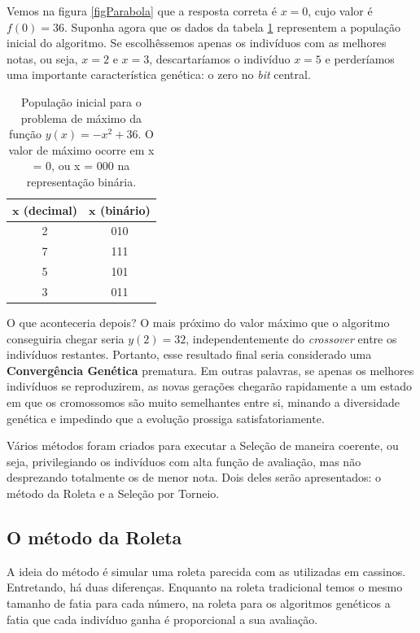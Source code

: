 	 Vemos na figura \ref{figParabola} que a resposta correta é $x = 0$, cujo valor é $f(0) = 36$. Suponha agora que os dados da tabela \ref{tabFuncMax} representem a população inicial do algoritmo. Se escolhêssemos apenas os indivíduos com as melhores notas, ou seja, $x = 2$ e $x = 3$, descartaríamos o indivíduo $x = 5$ e perderíamos uma importante característica genética: o zero no \textit{bit} central.
	 
\begin{table}[htp]
		\caption{\label{tabFuncMax}População inicial para o problema de máximo da função $y(x) = -x^2 + 36$. O valor de máximo ocorre em x = 0, ou x = 000 na representação binária.}
		\begin{center}
			\begin{tabular}{cc}
				\hline
				$\textbf{x}$ (decimal)		& $\textbf{x}$ (binário) \\
				\hline
				2							& 010 \\
				7							& 111 \\
				5							& 101 \\	
				3							& 011 \\
				\hline
			\end{tabular}
		\end{center}
	\end{table}
		
		O que aconteceria depois? O mais próximo do valor máximo que o algoritmo conseguiria chegar seria $y(2) = 32$, independentemente do \textit{crossover} entre os indivíduos restantes. Portanto, esse resultado final seria considerado uma \textbf{Convergência Genética} prematura. Em outras palavras, se apenas os melhores indivíduos se reproduzirem, as novas gerações chegarão rapidamente a um estado em que os cromossomos são muito semelhantes entre si, minando a diversidade genética e impedindo que a evolução prossiga satisfatoriamente.
		
		Vários métodos foram criados para executar a Seleção de maneira coerente, ou seja, privilegiando os indivíduos com alta função de avaliação, mas não desprezando totalmente os de menor nota. Dois deles serão apresentados: o método da Roleta e a Seleção por Torneio.
	
	\subsection{O método da Roleta}
	
	A ideia do método é simular uma roleta parecida com as utilizadas em cassinos. Entretando, há duas diferenças. Enquanto na roleta tradicional temos o mesmo tamanho de fatia para cada número, na roleta para os algoritmos genéticos a fatia que cada indivíduo ganha é proporcional a sua avaliação.
	
